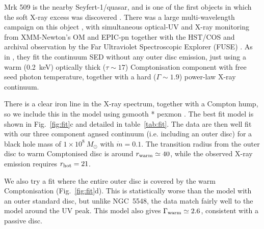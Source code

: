 \documentclass[a4paper,fleqn,usenatbib]{mnras}
\newcommand{\red}{\textcolor{red}}
\begin{document}
Mrk 509 is the nearby Seyfert-1/quasar, and is one of the first objects in which
the soft X-ray excess was discovered \citep{singh1985}.  There was a
large multi-wavelength campaign on this
object \citep{kaastra2011-1,kaastra2011-2}, with simultaneous
optical-UV and X-ray monitoring from XMM-Newton's 
 OM and EPIC-pn together with
the HST/COS and archival 
observation by the Far Ultraviolet Spectroscopic Explorer (FUSE) \citep{509}.  As in
\cite{5548}, they fit the continuum SED without any outer disc
emission, just using a warm (0.2~keV) optically thick ($\tau\sim17$)
Comptonisation component with free seed photon temperature, together
with a hard ($\Gamma\sim1.9$) power-law X-ray continuum.

There is a clear iron line in the X-ray spectrum, together with a
Compton hump, so we include this in the model using {\sc gsmooth *
  pexmon} \citep{nandra2007}. 
The best fit model is shown in Fig.~\ref{fig:fit}c and detailed in table~\ref{tab:fit}.
The data are then well fit with our three component
{\sc agnsed}   continuum (i.e. including an outer disc) for a black hole
mass of $1\times10^8~M_\odot$ with $\dot{m}=0.1$.  
The transition radius from
the outer disc to warm Comptonised disc is around 
$r_{\rm warm}\simeq 40$, while the observed X-ray emission requires $r_{\rm hot}=21$. 

We also try a fit where the entire outer disc is covered by the warm Comptonisation (Fig.~\ref{fig:fit}d). 
This is statistically worse than the model with an outer standard disc, but unlike NGC~5548, the data match fairly well to the model around the UV peak. 
This model also gives $\Gamma_{\rm warm}\simeq 2.6$, consistent with a passive disc.
\end{document}
